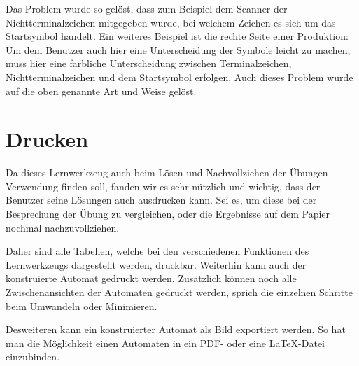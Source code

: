 Das Problem wurde so gelöst, dass zum Beispiel dem Scanner der
Nichtterminalzeichen mitgegeben wurde, bei welchem Zeichen es sich um das
Startsymbol handelt. Ein weiteres Beispiel ist die rechte Seite einer
Produktion: Um dem Benutzer auch hier eine Unterscheidung der Symbole leicht zu
machen, muss hier eine farbliche Unterscheidung zwischen Terminalzeichen,
Nichtterminalzeichen und dem Startsymbol erfolgen. Auch dieses Problem wurde auf
die oben genannte Art und Weise gelöst.\vspace{10pt}


\section{Drucken}\label{Print}

Da dieses Lernwerkzeug auch beim Lösen und Nachvollziehen der Übungen
Verwendung finden soll, fanden wir es sehr nützlich und wichtig, dass der
Benutzer seine Lösungen auch ausdrucken kann. Sei es, um diese bei der
Besprechung der Übung zu vergleichen, oder die Ergebnisse auf dem Papier
nochmal nachzuvollziehen.\vspace{10pt}

Daher sind alle Tabellen, welche bei den verschiedenen Funktionen des
Lernwerkzeugs dargestellt werden, druckbar. Weiterhin kann auch der konstruierte
Automat gedruckt werden. Zusätzlich können noch alle Zwischenansichten der
Automaten gedruckt werden, sprich die einzelnen Schritte beim Umwandeln oder
Minimieren.\vspace{10pt}

Desweiteren kann ein konstruierter Automat als Bild exportiert werden. So hat
man die Möglichkeit einen Automaten in ein PDF- oder eine \LaTeX -Datei
einzubinden.\vspace{10pt}



